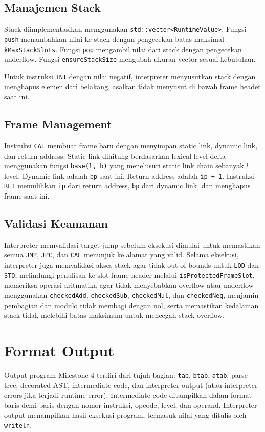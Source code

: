 \subsection{Manajemen Stack}
Stack diimplementasikan menggunakan \texttt{std::vector<RuntimeValue>}. Fungsi \texttt{push} menambahkan nilai ke stack dengan pengecekan batas maksimal \texttt{kMaxStackSlots}. Fungsi \texttt{pop} mengambil nilai dari stack dengan pengecekan underflow. Fungsi \texttt{ensureStackSize} mengubah ukuran vector sesuai kebutuhan.

Untuk instruksi \texttt{INT} dengan nilai negatif, interpreter menyusutkan stack dengan menghapus elemen dari belakang, asalkan tidak menyusut di bawah frame header saat ini.

\subsection{Frame Management}
Instruksi \texttt{CAL} membuat frame baru dengan menyimpan static link, dynamic link, dan return address. Static link dihitung berdasarkan lexical level delta menggunakan fungsi \texttt{base(l, b)} yang menelusuri static link chain sebanyak $l$ level. Dynamic link adalah \texttt{bp} saat ini. Return address adalah \texttt{ip + 1}. Instruksi \texttt{RET} memulihkan \texttt{ip} dari return address, \texttt{bp} dari dynamic link, dan menghapus frame saat ini.

\subsection{Validasi Keamanan}
Interpreter memvalidasi target jump sebelum eksekusi dimulai untuk memastikan semua \texttt{JMP}, \texttt{JPC}, dan \texttt{CAL} menunjuk ke alamat yang valid. Selama eksekusi, interpreter juga memvalidasi akses stack agar tidak out-of-bounds untuk \texttt{LOD} dan \texttt{STO}, melindungi penulisan ke slot frame header melalui \texttt{isProtectedFrameSlot}, memeriksa operasi aritmatika agar tidak menyebabkan overflow atau underflow menggunakan \texttt{checkedAdd}, \texttt{checkedSub}, \texttt{checkedMul}, dan \texttt{checkedNeg}, menjamin pembagian dan modulo tidak membagi dengan nol, serta memastikan kedalaman stack tidak melebihi batas maksimum untuk mencegah stack overflow.

\section{Format Output}
Output program Milestone 4 terdiri dari tujuh bagian: \texttt{tab}, \texttt{btab}, \texttt{atab}, parse tree, decorated AST, intermediate code, dan interpreter output (atau interpreter errors jika terjadi runtime error). Intermediate code ditampilkan dalam format baris demi baris dengan nomor instruksi, opcode, level, dan operand. Interpreter output menampilkan hasil eksekusi program, termasuk nilai yang ditulis oleh \texttt{writeln}.
